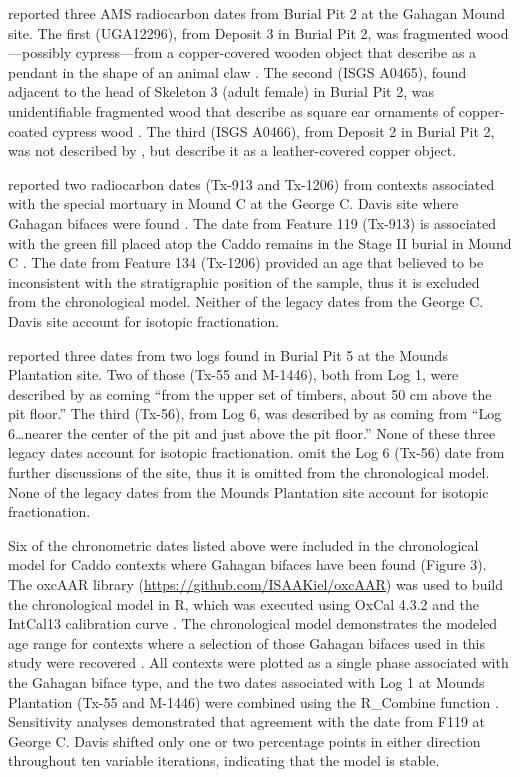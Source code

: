 \documentclass[review]{elsarticle}
\begin{document}
\citet[Table 1]{RN4783} reported three AMS radiocarbon dates from Burial Pit 2 at the Gahagan Mound site. The first (UGA12296), from Deposit 3 in Burial Pit 2, was fragmented wood—possibly cypress—from a copper-covered wooden object that \citet[99, Plate 29, No. 2, Object 5]{RN5274} describe as a pendant in the shape of an animal claw \citep{RN4783}. The second (ISGS A0465), found adjacent to the head of Skeleton 3 (adult female) in Burial Pit 2, was unidentifiable fragmented wood that \citet[96, Plate 21 and 28, Nos. 2-3]{RN5274} describe as square ear ornaments of copper-coated cypress wood \citep{RN4783}. The third (ISGS A0466), from Deposit 2 in Burial Pit 2, was not described by \citet[96]{RN5274}, but \citet[62]{RN4783} describe it as a leather-covered copper object.

\citet[Table 1]{RN3714} reported two radiocarbon dates (Tx-913 and Tx-1206) from contexts associated with the special mortuary in Mound C at the George C. Davis site where Gahagan bifaces were found \citep[Table 5]{RN3714}. The date from Feature 119 (Tx-913) is associated with the green fill placed atop the Caddo remains in the Stage II burial in Mound C \citep{RN3714}. The date from Feature 134 (Tx-1206) provided an age that \citet{RN3714} believed to be inconsistent with the stratigraphic position of the sample, thus it is excluded from the chronological model. Neither of the legacy dates from the George C. Davis site account for isotopic fractionation.

\citet[72]{RN11561} reported three dates from two logs found in Burial Pit 5 at the Mounds Plantation site. Two of those (Tx-55 and M-1446), both from Log 1, were described by \citet[72]{RN11561} as coming “from the upper set of timbers, about 50 cm above the pit floor.” The third (Tx-56), from Log 6, was described by \citet[72]{RN11561} as coming from “Log 6…nearer the center of the pit and just above the pit floor.” None of these three legacy dates account for isotopic fractionation. \citet{RN11561} omit the Log 6 (Tx-56) date from further discussions of the site, thus it is omitted from the chronological model. None of the legacy dates from the Mounds Plantation site account for isotopic fractionation.

Six of the chronometric dates listed above were included in the chronological model for Caddo contexts where Gahagan bifaces have been found (Figure 3). The oxcAAR library (\href{https://github.com/ISAAKiel/oxcAAR}{https://github.com/ISAAKiel/oxcAAR}) was used to build the chronological model in R, which was executed using OxCal 4.3.2 \citep{RN5514,RN20716} and the IntCal13 calibration curve \citep{RN4406}. The chronological model demonstrates the modeled age range for contexts where a selection of those Gahagan bifaces used in this study were recovered \citep{RN20850}. All contexts were plotted as a single phase associated with the Gahagan biface type, and the two dates associated with Log 1 at Mounds Plantation (Tx-55 and M-1446) were combined using the R\_Combine function \citep{RN20850}. Sensitivity analyses demonstrated that agreement with the date from F119 at George C. Davis shifted only one or two percentage points in either direction throughout ten variable iterations, indicating that the model is stable.
\end{document}
